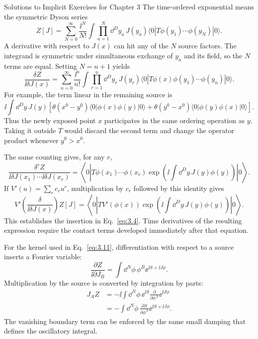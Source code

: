 \begin{bankssolutions}{Solutions to Implicit Exercises for Chapter 3}
The time-ordered exponential means the symmetric Dyson series
\[
 Z[J]=\sum_{N=0}^{\infty}\frac{\ii^N}{N!}
 \int\prod_{a=1}^N\dd^D y_a\,J(y_a)
 \langle0|T\phi(y_1)\cdots\phi(y_N)|0\rangle.
\]
A derivative with respect to $J(x)$ can hit any of the $N$ source factors.
The integrand is symmetric under simultaneous exchange of $y_a$ and its
field, so the $N$ terms are equal.  Setting $N=n+1$ yields
\[
 \frac{\delta Z}{\ii\delta J(x)}
 =\sum_{n=0}^{\infty}\frac{\ii^n}{n!}
 \int\prod_{r=1}^n\dd^D y_r\,J(y_r)
 \langle0|T\phi(x)\phi(y_1)\cdots\phi(y_n)|0\rangle.
\]
For example, the term linear in the remaining source is
\[
 \ii\int\dd^D y\,J(y)\left[
 \theta(x^0-y^0)\langle0|\phi(x)\phi(y)|0\rangle
 +\theta(y^0-x^0)\langle0|\phi(y)\phi(x)|0\rangle\right].
\]
Thus the newly exposed point $x$ participates in the same ordering operation
as $y$.  Taking it outside $T$ would discard the second term and change the
operator product whenever $y^0>x^0$.

The same counting gives, for any $r$,
\[
 \frac{\delta^r Z}
 {\ii\delta J(x_1)\cdots\ii\delta J(x_r)}
 =\left\langle0\left|T\phi(x_1)\cdots\phi(x_r)
 \exp\!\left(\ii\int\dd^D y\,J(y)\phi(y)\right)\right|0\right\rangle.
\]
If $V'(u)=\sum_r c_r u^r$, multiplication by $c_r$ followed by this identity
gives
\[
 V'\!\left(\frac{\delta}{\ii\delta J(x)}\right)Z[J]
 =\left\langle0\left|T V'(\phi(x))
 \exp\!\left(\ii\int\dd^D y\,J(y)\phi(y)\right)\right|0\right\rangle.
\]
This establishes the insertion in Eq.~\eqref{eq:3.4}.  Time derivatives of
the resulting expression require the contact terms developed immediately
after that equation.

For the kernel used in Eq.~\eqref{eq:3.11}, differentiation with respect to a
source inserts a Fourier variable:
\[
 \frac{\partial Z}{\ii\partial J_B}
 =\int\dd^N\phi\,\phi^B\ee^{\ii S+\ii J\phi}.
\]
Multiplication by the source is converted by integration by parts:
\begin{align*}
 J_A Z
 &=-\ii\int\dd^N\phi\,\ee^{\ii S}
        \frac{\partial}{\partial\phi^A}\ee^{\ii J\phi}\\
 &=-\int\dd^N\phi\,
       \frac{\partial S}{\partial\phi^A}\ee^{\ii S+\ii J\phi}.
\end{align*}
The vanishing boundary term can be enforced by the same small damping that
defines the oscillatory integral.


\end{bankssolutions}

